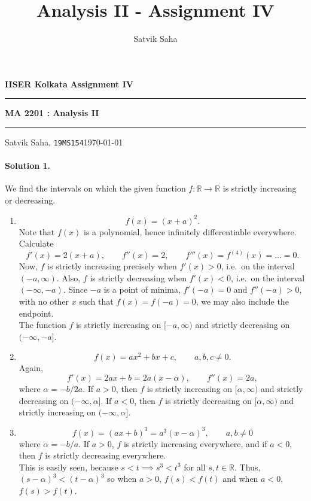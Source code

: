 \documentclass[10pt]{article}
\title{Analysis II - Assignment IV}
\author{Satvik Saha}
\date{}
\def\R{\mathbb{R}}
\begin{document}
    \par\textbf{IISER Kolkata} \hfill \textbf{Assignment IV}
    \vspace{3pt}
    \hrule
    \vspace{3pt}
    \begin{center}
            \LARGE{\textbf{MA 2201 : Analysis II}}
    \end{center}
    \vspace{3pt}
    \hrule
    \vspace{3pt}
    Satvik Saha, \texttt{19MS154}\hfill\today
    \vspace{20pt}
    
    \paragraph{Solution 1.}
    We find the intervals on which the given function $f\colon \R \to \R$ is
    strictly increasing or decreasing.
    \begin{enumerate}
        \item \[
            f(x) = (x + a)^2.
        \] Note that $f(x)$ is a polynomial, hence infinitely differentiable
        everywhere. Calculate \[
            f'(x) = 2(x + a), \qquad f''(x) = 2, \qquad f'''(x) = f^{(4)}(x) = \dots
            = 0.
        \] Now, $f$ is strictly increasing precisely when $f'(x) > 0$, i.e.\ on the
        interval $(-a, \infty)$. Also, $f$ is strictly decreasing when $f'(x) < 0$,
        i.e.\ on the interval $(-\infty, -a)$. Since $-a$ is a point of minima,
        $f'(-a) = 0$ and $f''(-a) > 0$, with no other $x$ such that $f(x) = f(-a) =
        0$, we may also include the endpoint. \\

        The function $f$ is strictly increasing on $[-a, \infty)$ and strictly
        decreasing on $(-\infty, -a]$.

        \item \[
            f(x) = ax^2 + bx + c, \qquad a, b, c \neq 0.
        \] Again, \[
            f'(x) = 2ax + b = 2a(x - \alpha), \qquad f''(x) = 2a,
        \] where $\alpha = -b / 2a$.
        If $a > 0$, then $f$ is strictly increasing on $[\alpha, \infty)$ and
        strictly decreasing on $(-\infty, \alpha]$. 
        If $a < 0$, then $f$ is strictly decreasing on $[\alpha, \infty)$ and
        strictly increasing on $(-\infty, \alpha]$. 

        \item \[
            f(x) = (ax + b)^3 = a^3(x - \alpha)^3, \qquad a, b \neq 0
        \] where $\alpha = - b / a$. If $a > 0$, $f$ is strictly increasing
        everywhere, and if $a < 0$, then $f$ is strictly decreasing everywhere. \\

        This is easily seen, because $s < t \implies s^3 < t^3$ for all $s, t \in
        \R$. Thus, $(s - \alpha)^3 < (t - \alpha)^3$ so when $a > 0$, $f(s) < f(t)$
        and when $a < 0$, $f(s) > f(t)$.
    \end{enumerate}
\end{document}
